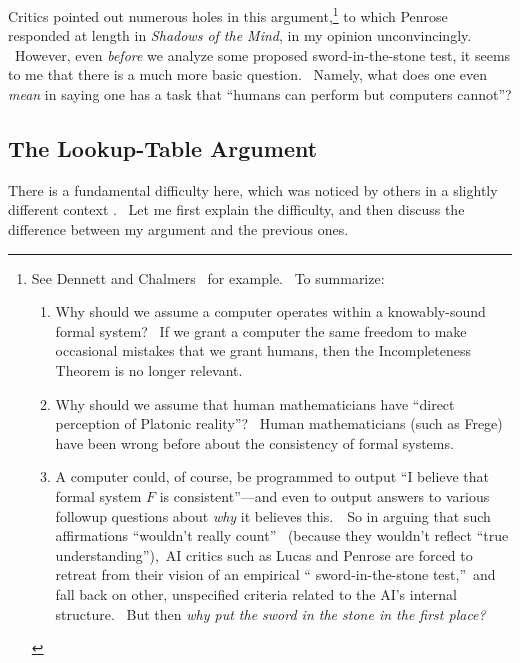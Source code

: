 \documentclass[12pt,onecolumn]{article}%
\begin{document}
Critics pointed out numerous holes in this argument,\footnote{See Dennett
\cite{dennett} and Chalmers \cite{chalmers}\ for example. \ To summarize:
\par
\begin{enumerate}
\item[(1)] Why should we assume a computer operates within a knowably-sound
formal system? \ If we grant a computer the same freedom to make occasional
mistakes that we grant humans, then the Incompleteness Theorem is no longer
relevant.
\par
\item[(2)] Why should we assume that human mathematicians have
\textquotedblleft direct perception of Platonic reality\textquotedblright?
\ Human mathematicians (such as Frege) have been wrong before about the
consistency of formal systems.
\par
\item[(3)] A computer could, of course, be programmed to output
\textquotedblleft I believe that formal system $F$ is
consistent\textquotedblright---and even to output answers to various followup
questions about \textit{why} it believes this.\ \ So in arguing that such
affirmations \textquotedblleft wouldn't really count\textquotedblright%
\ (because they wouldn't reflect \textquotedblleft true
understanding\textquotedblright),\ AI critics such as Lucas and Penrose are
forced to retreat from their vision of an empirical \textquotedblleft
sword-in-the-stone test,\textquotedblright\ and fall back on other,
unspecified criteria related to the AI's internal structure. \ But then
\textit{why put the sword in the stone in the first place?}
\end{enumerate}
} to which Penrose responded at length in \textit{Shadows of the Mind}, in my
opinion unconvincingly. \ However, even \textit{before} we analyze some
proposed sword-in-the-stone test, it seems to me that there is a much more
basic question. \ Namely, what does one even \textit{mean} in saying one has a
task that \textquotedblleft humans can perform but computers
cannot\textquotedblright?

\subsection{The Lookup-Table Argument\label{LOOKUP}}

There is a fundamental difficulty here, which was noticed by others in a
slightly different context \cite{block,parberry,levesque,shieber}. \ Let me
first explain the difficulty, and then discuss the difference between my
argument and the previous ones.
\end{document}

